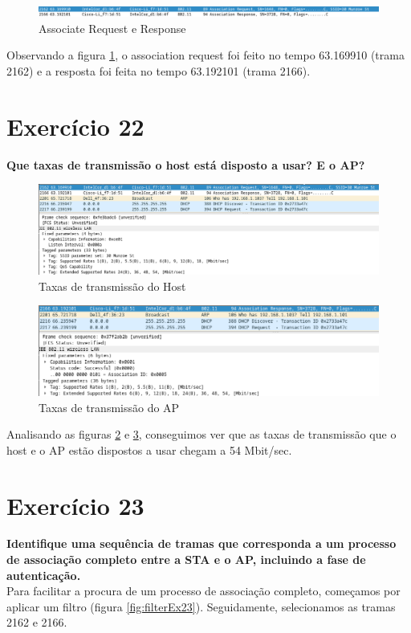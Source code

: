 \documentclass[a4paper]{report}
\begin{document}
\begin{figure}[H]
    \centering 
    \includegraphics[width=\textwidth]{images/associationEx21.png}  
    \caption{Associate Request e Response}
    \label{fig:associationEx21}
\end{figure}
Observando a figura \ref{fig:associationEx21}, o association request foi feito 
no tempo 63.169910 (trama 2162) e a resposta foi feita no tempo 63.192101 
(trama 2166).

\section{Exercício 22}
\textbf{Que taxas de transmissão o host está disposto a usar? E o AP?}\\

\begin{figure}[H]
    \centering 
    \includegraphics[width=\textwidth]{images/hostEx22.png}  
    \caption{Taxas de transmissão do Host}
    \label{fig:hostEx22}
\end{figure}

\begin{figure}[H]
    \centering 
    \includegraphics[width=\textwidth]{images/apEx22.png}  
    \caption{Taxas de transmissão do AP}
    \label{fig:apEx22}
\end{figure}
Analisando as figuras \ref{fig:hostEx22} e \ref{fig:apEx22}, conseguimos ver que
as taxas de transmissão que o host e o AP estão dispostos a usar chegam a 54 Mbit/sec.

\section{Exercício 23}
\textbf{Identifique uma sequência de tramas que corresponda a um processo de
associação completo entre a STA e o AP, incluindo a fase de autenticação.}\\
Para facilitar a procura de um processo de associação completo, começamos por aplicar
um filtro (figura \ref{fig:filterEx23}). Seguidamente, selecionamos as tramas 2162 e 2166.
\end{document}
